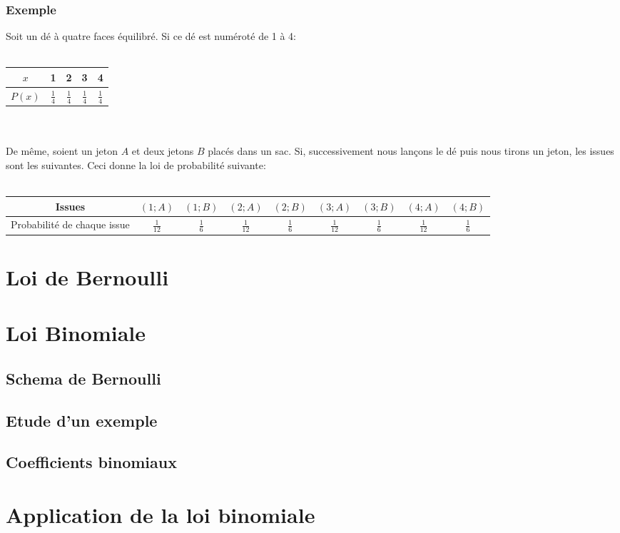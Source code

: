 \documentclass{article}
\begin{document}
\subsubsection*{Exemple}
Soit un dé à quatre faces équilibré. Si ce dé est numéroté de 1 à 4:\\\\
\begin{centering}
	\begin{tabular}{|c|c|c|c|c|}
		\hline
		$x$ & 1 & 2 & 3 & 4 \\ \hline
		$P(x)$ & $\frac{1}{4}$ & $\frac{1}{4}$ & $\frac{1}{4}$ & $\frac{1}{4}$ \\ \hline
	\end{tabular}
\end{centering}\\\\
De même, soient un jeton $A$ et deux jetons $B$ placés dans un sac. Si, successivement nous lançons le dé puis nous tirons un jeton, les issues sont les suivantes.
%		
Ceci donne la loi de probabilité suivante:\\\\
\begin{centering}
	\begin{tabular}{|c|c|c|c|c|c|c|c|c|}
		\hline
		Issues & $(1;A)$ & $(1;B)$ & $(2;A)$ & $(2;B)$ & $(3;A)$ & $(3;B)$ & $(4;A)$ & $(4;B)$ \\ \hline
		Probabilité de chaque issue & $\frac{1}{12}$ &$\frac{1}{6}$&$\frac{1}{12}$&$\frac{1}{6}$ &  $\frac{1}{12}$&$\frac{1}{6}$ & $\frac{1}{12}$ & $\frac{1}{6}$\\ \hline
	\end{tabular}
\end{centering}


\section{Loi de Bernoulli}


\section{Loi Binomiale}

\subsection{Schema de Bernoulli}

\subsection{Etude d'un exemple}

\subsection{Coefficients binomiaux}


\section{Application de la loi binomiale}
\end{document}
